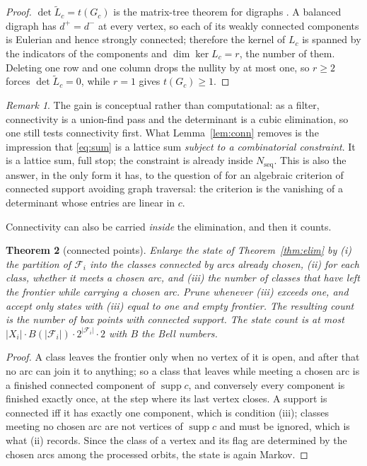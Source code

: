 \documentclass[11pt]{article}
\theoremstyle{plain}
\newtheorem{theorem}{Theorem}
\theoremstyle{definition}
\theoremstyle{remark}
\newtheorem{remark}[theorem]{Remark}
\newcommand{\supp}{\operatorname{supp}}
\newcommand{\Nseq}{N_{\mathrm{seq}}}
\newcommand{\Fr}{\mathcal{F}}
\begin{document}
\begin{proof}
$\det\widetilde L_c=t(G_c)$ is the matrix-tree theorem for digraphs \cite{Tutte48}. A balanced
digraph has $d^+=d^-$ at every vertex, so each of its weakly connected components is Eulerian
and hence strongly connected; therefore the kernel of $L_c$ is spanned by the indicators of
the components and $\dim\ker L_c=r$, the number of them. Deleting one row and one column drops
the nullity by at most one, so $r\ge2$ forces $\det\widetilde L_c=0$, while $r=1$ gives
$t(G_c)\ge1$.
\end{proof}

\begin{remark}\label{rem:predicate}
The gain is conceptual rather than computational: as a filter, connectivity is a union-find
pass and the determinant is a cubic elimination, so one still tests connectivity first. What
Lemma~\ref{lem:conn} removes is the impression that \eqref{eq:sum} is a lattice sum
\emph{subject to a combinatorial constraint}. It is a lattice sum, full stop; the constraint
is already inside $\Nseq$. This is also the answer, in the only form it has, to the question of
\cite{Bio8} for an algebraic criterion of connected support avoiding graph traversal: the
criterion is the vanishing of a determinant whose entries are linear in $c$.
\end{remark}

Connectivity can also be carried \emph{inside} the elimination, and then it counts.

\begin{theorem}[connected points]\label{thm:connected}
Enlarge the state of Theorem~\ref{thm:elim} by (i) the partition of $\Fr_i$ into the classes
connected by arcs already chosen, (ii) for each class, whether it meets a chosen arc, and
(iii) the number of classes that have left the frontier while carrying a chosen arc. Prune
whenever (iii) exceeds one, and accept only states with (iii) equal to one and empty frontier.
The resulting count is the number of box points with connected support. The state count is at
most $|X_i|\cdot B(|\Fr_i|)\cdot2^{|\Fr_i|}\cdot2$ with $B$ the Bell numbers.
\end{theorem}

\begin{proof}
A class leaves the frontier only when no vertex of it is open, and after that no arc can join
it to anything; so a class that leaves while meeting a chosen arc is a finished connected
component of $\supp c$, and conversely every component is finished exactly once, at the step
where its last vertex closes. A support is connected iff it has exactly one component, which
is condition (iii); classes meeting no chosen arc are not vertices of $\supp c$ and must be
ignored, which is what (ii) records. Since the class of a vertex and its flag are determined
by the chosen arcs among the processed orbits, the state is again Markov.
\end{proof}
\end{document}
